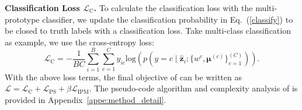 \noindent\textbf{Classification Loss $\mathcal{L}_{\mathrm{C}}$.} 
To calculate the classification loss with the multi-prototype classifier, we update the classification probability in Eq.~(\ref{classify}) to be closed to truth labels with a classification loss. Take multi-class classification as example, we use the cross-entropy loss:
\begin{equation}\label{cls}
    \mathcal{L}_{\mathrm{C}} = - \frac{1}{BC} \sum_{i=1}^{B}\sum_{c=1}^{C}y_{ic}\text{log}(p(y = c \mid \hat{\mathbf{z}}_{i}; \{ w^{c},\boldsymbol{\mu}^{(c)} \}_{c=1}^{(C)})).
\end{equation}
With the above loss terms, the final objective of \ourmethod can be written as $\mathcal{L}=\mathcal{L}_{\mathrm{C}}+\mathcal{L}_{\mathrm{PS}}+\beta\mathcal{L}_{\mathrm{IPM}}$. The pseudo-code algorithm and complexity analysis of \ourmethod is provided in Appendix~\ref{appe:method_detail}. 
